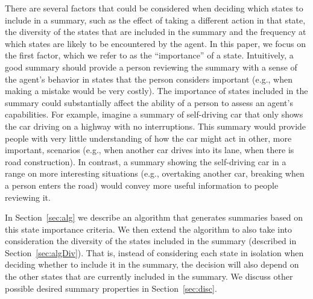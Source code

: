 There are several factors that could be considered when deciding which states to include in a summary, such as the effect of taking a different action in that state, the diversity of the states that are included in the summary and the frequency at which states are likely to be encountered by the agent. In this paper, we focus on the first factor, which we refer to as the ``importance'' of a state. Intuitively, a good summary should provide a person reviewing the summary with a sense of the agent's behavior in states that the person considers important (e.g., when making a mistake would be very costly). The importance of states included in the summary could substantially affect the ability of a person to assess an agent's capabilities. For example, imagine a summary of self-driving car that only shows the car driving on a highway with no interruptions. This summary would provide people with very little understanding of how the car might act in other, more important, scenarios (e.g., when another car drives into its lane, when there is road construction). In contrast, a summary showing the self-driving car in a range on more interesting situations (e.g., overtaking another car, breaking when a person enters the road) would convey more useful information to people reviewing it. 

In Section~\ref{sec:alg} we describe an algorithm that generates summaries based on this state importance criteria. We then extend the algorithm to also take into consideration the diversity of the states included in the summary (described in Section~\ref{sec:algDiv}). That is, instead of considering each state in isolation when deciding whether to include it in the summary, the decision will also depend on the other states that are currently included in the summary. We discuss other possible desired summary properties in Section~\ref{sec:disc}. 


